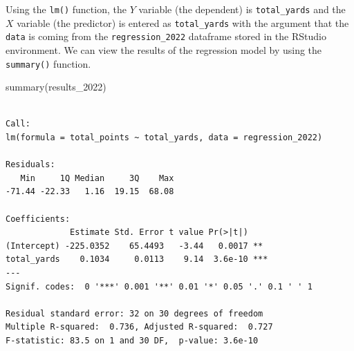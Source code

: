 \documentclass[
  letterpaper,
]{krantz}
\newenvironment{Shaded}{\begin{snugshade}}{\end{snugshade}}
\newcommand{\FunctionTok}[1]{\textcolor[rgb]{0.28,0.35,0.67}{#1}}
\newcommand{\NormalTok}[1]{\textcolor[rgb]{0.00,0.23,0.31}{#1}}
\begin{document}
Using the \texttt{lm()} function, the \(Y\) variable (the dependent) is
\texttt{total\_yards} and the \(X\) variable (the predictor) is entered
as \texttt{total\_yards} with the argument that the \texttt{data} is
coming from the \texttt{regression\_2022} dataframe stored in the
RStudio environment. We can view the results of the regression model by
using the \texttt{summary()} function.

\begin{Shaded}
\begin{Highlighting}[]
\FunctionTok{summary}\NormalTok{(results\_2022)}
\end{Highlighting}
\end{Shaded}

\begin{verbatim}

Call:
lm(formula = total_points ~ total_yards, data = regression_2022)

Residuals:
   Min     1Q Median     3Q    Max 
-71.44 -22.33   1.16  19.15  68.08 

Coefficients:
             Estimate Std. Error t value Pr(>|t|)    
(Intercept) -225.0352    65.4493   -3.44   0.0017 ** 
total_yards    0.1034     0.0113    9.14  3.6e-10 ***
---
Signif. codes:  0 '***' 0.001 '**' 0.01 '*' 0.05 '.' 0.1 ' ' 1

Residual standard error: 32 on 30 degrees of freedom
Multiple R-squared:  0.736, Adjusted R-squared:  0.727 
F-statistic: 83.5 on 1 and 30 DF,  p-value: 3.6e-10
\end{verbatim}
\end{document}
